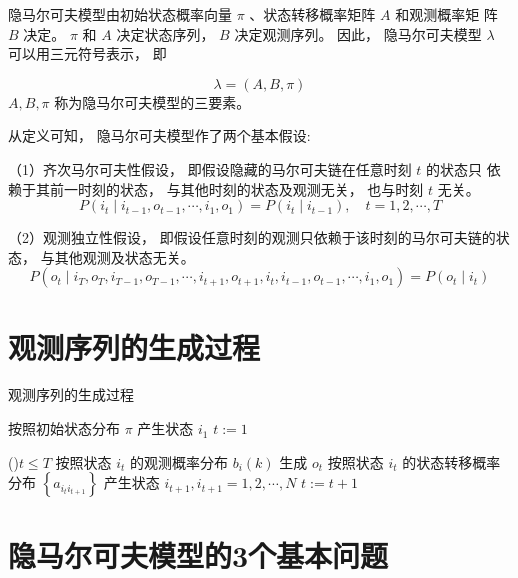隐马尔可夫模型由初始状态概率向量 $ \pi $ 、状态转移概率矩阵 $ A $ 和观测概率矩 阵 $ B $ 决定。 $ \pi $ 和 $ A $ 决定状态序列， $ B $ 决定观测序列。 因此， 隐马尔可夫模型 $ \lambda $ 可以用三元符号表示， 即

\begin{equation}
\lambda=(A, B, \pi)
\end{equation}
$ A, B, \pi $ 称为隐马尔可夫模型的三要素。

从定义可知， 隐马尔可夫模型作了两个基本假设:

（1）齐次马尔可夫性假设， 即假设隐藏的马尔可夫链在任意时刻 $ t $ 的状态只 依赖于其前一时刻的状态， 与其他时刻的状态及观测无关， 也与时刻 $ t $ 无关。
\begin{equation}
P\left(i_{t} \mid i_{t-1}, o_{t-1}, \cdots, i_{1}, o_{1}\right)=P\left(i_{t} \mid i_{t-1}\right), \quad t=1,2, \cdots, T
\end{equation}

（2）观测独立性假设， 即假设任意时刻的观测只依赖于该时刻的马尔可夫链的状态， 与其他观测及状态无关。
\begin{equation}
P\left(o_{t} \mid i_{T}, o_{T}, i_{T-1}, o_{T-1}, \cdots, i_{t+1}, o_{t+1}, i_{t}, i_{t-1}, o_{t-1}, \cdots, i_{1}, o_{1}\right)=P\left(o_{t} \mid i_{t}\right)
\end{equation}

\section{观测序列的生成过程}

\begin{algorithm}[htbp]
    \caption{观测序列的生成过程}

    按照初始状态分布 $ \pi $ 产生状态 $ i_{1} $\;
    $ t:=1 $\;

    \While(){$t \le T$}{
        按照状态 $ i_{t} $ 的观测概率分布 $ b_{i}(k) $ 生成 $ o_{t} $\;
        按照状态 $ i_{t} $ 的状态转移概率分布 $ \left\{a_{i_{t} i_{t+1}}\right\} $ 产生状态 $ i_{t+1}, i_{t+1}=1,2, \cdots, N $\; 
        $t := t + 1$\;
    }
\end{algorithm}

\section{隐马尔可夫模型的3个基本问题}

